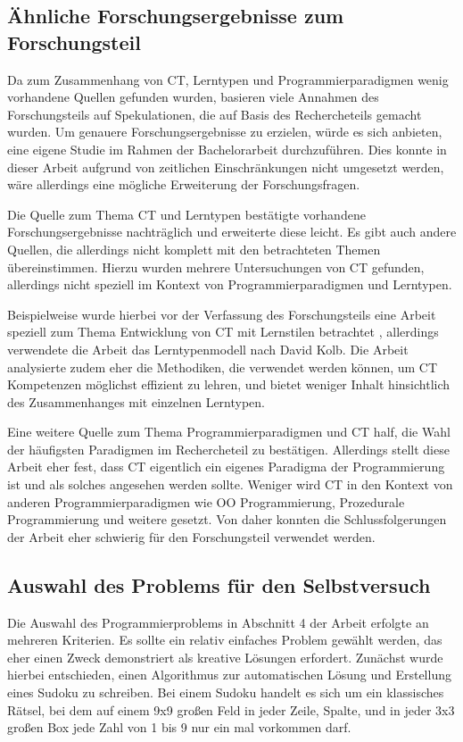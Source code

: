 \subsection{Ähnliche Forschungsergebnisse zum Forschungsteil}\label{sec:similar_srcs}
Da zum Zusammenhang von CT, Lerntypen und Programmierparadigmen wenig vorhandene Quellen gefunden wurden, basieren viele Annahmen des Forschungsteils auf Spekulationen, die auf Basis des Rechercheteils gemacht wurden.
Um genauere Forschungsergebnisse zu erzielen, würde es sich anbieten, eine eigene Studie im Rahmen der Bachelorarbeit durchzuführen. Dies konnte in dieser Arbeit aufgrund von zeitlichen Einschränkungen nicht umgesetzt werden, wäre allerdings eine mögliche Erweiterung der Forschungsfragen.

Die Quelle zum Thema CT und Lerntypen \cite{chen} bestätigte vorhandene Forschungsergebnisse nachträglich und erweiterte diese leicht. Es gibt auch andere Quellen, die allerdings nicht komplett mit den betrachteten Themen übereinstimmen. Hierzu wurden mehrere Untersuchungen von CT gefunden, allerdings nicht speziell im Kontext von Programmierparadigmen und Lerntypen.

Beispielweise wurde hierbei vor der Verfassung des Forschungsteils eine Arbeit speziell zum Thema Entwicklung von CT mit Lernstilen betrachtet \cite{boardgames}, allerdings verwendete die Arbeit das Lerntypenmodell nach David Kolb. Die Arbeit analysierte zudem eher die Methodiken, die verwendet werden können, um CT Kompetenzen möglichst effizient zu lehren, und bietet weniger Inhalt hinsichtlich des Zusammenhanges mit einzelnen Lerntypen.

Eine weitere Quelle \cite{michaelson} zum Thema Programmierparadigmen und CT half, die Wahl der häufigsten Paradigmen im Rechercheteil zu bestätigen. Allerdings stellt diese Arbeit eher fest, dass CT eigentlich ein eigenes Paradigma der Programmierung ist und als solches angesehen werden sollte. Weniger wird CT in den Kontext von anderen Programmierparadigmen wie OO Programmierung, Prozedurale Programmierung und weitere gesetzt. Von daher konnten die Schlussfolgerungen der Arbeit eher schwierig für den Forschungsteil verwendet werden.

\subsection{Auswahl des Problems für den Selbstversuch}\label{sec:choice_prac}
Die Auswahl des Programmierproblems in Abschnitt 4 der Arbeit erfolgte an mehreren Kriterien. Es sollte ein relativ einfaches Problem gewählt werden, das eher einen Zweck demonstriert als kreative Lösungen erfordert.
Zunächst wurde hierbei entschieden, einen Algorithmus zur automatischen Lösung und Erstellung eines Sudoku zu schreiben.
Bei einem Sudoku handelt es sich um ein klassisches Rätsel, bei dem auf einem 9x9 großen Feld in jeder Zeile, Spalte, und in jeder 3x3 großen Box jede Zahl von 1 bis 9 nur ein mal vorkommen darf.


